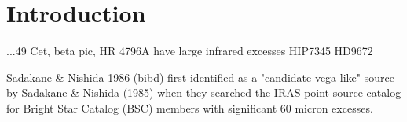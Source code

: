 \chapter{Introduction}

...49 Cet, beta pic, HR 4796A have large infrared excesses
HIP7345
HD9672

Sadakane & Nishida 1986 (bibd)
first identified as a "candidate vega-like" source by Sadakane & Nishida (1985) when they searched the IRAS point-source catalog for Bright Star Catalog (BSC) members with significant 60 micron excesses. 

